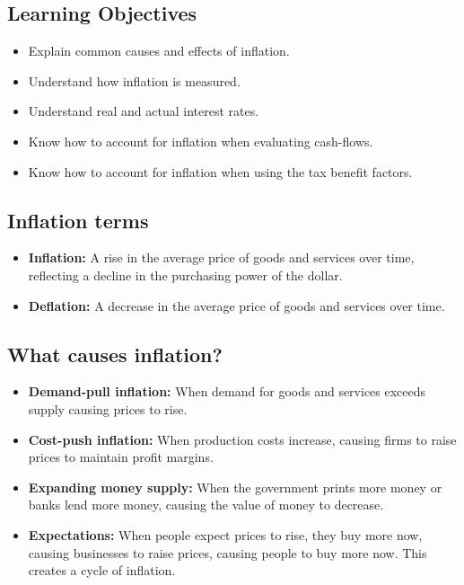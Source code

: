 \subsection{Learning Objectives}
\begin{summary}
    \begin{itemize}
        \item Explain common causes and effects of inflation. 
        \item Understand how inflation is measured. 
        \item Understand real and actual interest rates. 
        \item Know how to account for inflation when evaluating cash-flows.
        \item Know how to account for inflation when using the tax benefit factors. 
    \end{itemize}
\end{summary}

\subsection{Inflation terms}
\begin{terminology}
    \begin{itemize}
        \item \textbf{Inflation:} A rise in the average price of goods and services over time, reflecting a decline in the purchasing power of the dollar.
        \item \textbf{Deflation:} A decrease in the average price of goods and services over time.
    \end{itemize}
\end{terminology}

\subsection{What causes inflation?}
\begin{definition}
    \begin{itemize}
        \item \textbf{Demand-pull inflation:} When demand for goods and services exceeds supply causing prices to rise.
        \item \textbf{Cost-push inflation:} When production costs increase, causing firms to raise prices to maintain profit margins.
        \item \textbf{Expanding money supply:} When the government prints more money or banks lend more money, causing the value of money to decrease.
        \item \textbf{Expectations:} When people expect prices to rise, they buy more now, causing businesses to raise prices, causing people to buy more now. This creates a cycle of inflation.
    \end{itemize}
\end{definition}

